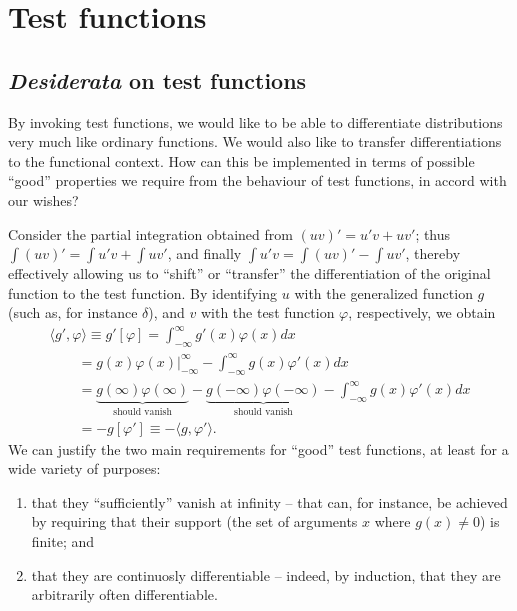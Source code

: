 \section{Test functions}

\subsection{{\it Desiderata} on test functions}

By invoking test functions, we would like to be able to differentiate distributions very much like ordinary functions.
We would also like to transfer differentiations to the functional context.
How can this be implemented in terms of possible ``good'' properties we require from the behaviour of test functions, in accord with our wishes?

Consider the partial integration
obtained from $(uv)' = u'v+uv'$; thus
$\int (uv)' = \int u'v+\int uv'$,
and finally   $\int u'v = \int (uv)'  -\int uv'$,
thereby effectively allowing us to ``shift'' or ``transfer''
the differentiation of the original function to the test function.
By identifying $u$ with the generalized function $g$ (such as, for instance  $\delta$),
and $v$ with the test function $\varphi$, respectively, we obtain
\begin{equation}
\begin{split}
\langle g' ,    \varphi  \rangle
\equiv
g'[\varphi] =
\int_{-\infty}^\infty
g'(x)\varphi(x)
dx      \\
\qquad
=
\left.
g(x)\varphi(x)\right|_{-\infty}^\infty
-  \int_{-\infty}^\infty
g(x)\varphi'(x)
dx           \\
\qquad
=
\underbrace{g(\infty)\varphi(\infty)}_{\textrm{should vanish}} - \underbrace{g(-\infty)\varphi(-\infty)}_{\textrm{should vanish}}
-  \int_{-\infty}^\infty
g(x)\varphi'(x)
dx  \\
\qquad
= - g[\varphi'] \equiv   -   \langle g ,    \varphi'  \rangle
.
\end{split}
\label{2012-m-ch-di-desiderata}
\end{equation}
We can justify the two main requirements for ``good'' test functions, at least for a wide variety of purposes:
\begin{enumerate}
\item
that they ``sufficiently'' vanish at infinity -- that can, for instance, be achieved by requiring that their support
(the set of arguments $x$ where $g(x)\neq 0$) is finite; and
\item
that they are continuosly differentiable -- indeed, by induction, that they are arbitrarily often differentiable.
\end{enumerate}

